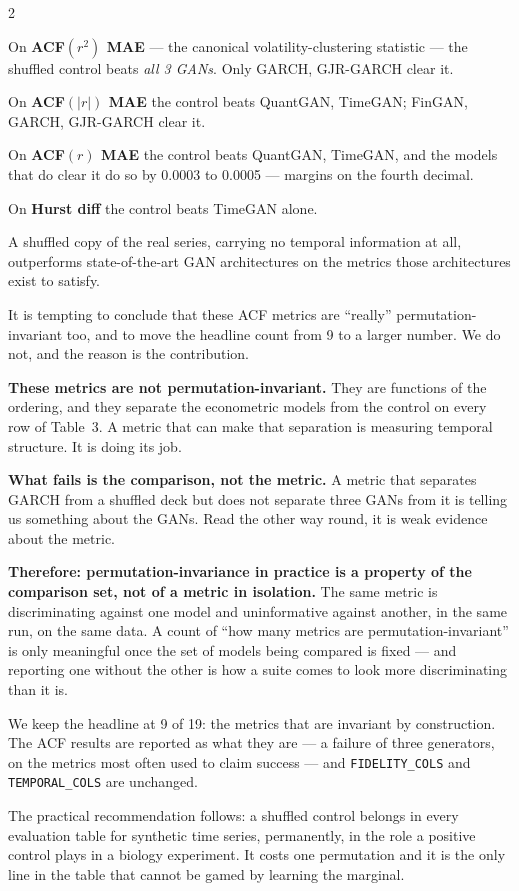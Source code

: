 \documentclass[10pt]{article}
\newcommand{\purplebox}[2]{\begin{tcolorbox}[mybox={Purple}{LBg},title={#1}]#2\end{tcolorbox}}
\begin{document}
\begin{multicols}{2}
{\smallskip
On \textbf{ACF$(r^2)$ MAE} --- the canonical volatility-clustering statistic --- the shuffled control beats \emph{all 3 GANs}. Only GARCH, GJR-GARCH clear it.

On \textbf{ACF$(|r|)$ MAE} the control beats QuantGAN, TimeGAN; FinGAN, GARCH, GJR-GARCH clear it.

On \textbf{ACF$(r)$ MAE} the control beats QuantGAN, TimeGAN, and the models that do clear it do so by 0.0003 to 0.0005 --- margins on the fourth decimal.

On \textbf{Hurst diff} the control beats TimeGAN alone.

\smallskip
A shuffled copy of the real series, carrying no temporal information at all, outperforms state-of-the-art GAN architectures on the metrics those architectures exist to satisfy.}

\columnbreak

\purplebox{What This Does and Does Not License}{%
It is tempting to conclude that these ACF metrics are ``really'' permutation-invariant too, and to move the headline count from 9 to a larger number. We do not, and the reason is the contribution.

\smallskip
\textbf{These metrics are not permutation-invariant.} They are functions of the ordering, and they separate the econometric models from the control on every row of Table~3. A metric that can make that separation is measuring temporal structure. It is doing its job.

\smallskip
\textbf{What fails is the comparison, not the metric.} A metric that separates GARCH from a shuffled deck but does not separate three GANs from it is telling us something about the GANs. Read the other way round, it is weak evidence about the metric.

\smallskip
\textbf{Therefore: permutation-invariance in practice is a property of the comparison set, not of a metric in isolation.} The same metric is discriminating against one model and uninformative against another, in the same run, on the same data. A count of ``how many metrics are permutation-invariant'' is only meaningful once the set of models being compared is fixed --- and reporting one without the other is how a suite comes to look more discriminating than it is.

\smallskip
We keep the headline at 9 of 19: the metrics that are invariant by construction. The ACF results are reported as what they are --- a failure of three generators, on the metrics most often used to claim success --- and \texttt{FIDELITY\_COLS} and \texttt{TEMPORAL\_COLS} are unchanged.

\smallskip
The practical recommendation follows: a shuffled control belongs in every evaluation table for synthetic time series, permanently, in the role a positive control plays in a biology experiment. It costs one permutation and it is the only line in the table that cannot be gamed by learning the marginal.}

\end{multicols}
\end{document}
